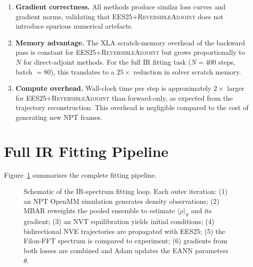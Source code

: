 \documentclass{article}
\newcommand{\EES}{\textsc{EES25}}
\newcommand{\RevAdj}{\textsc{ReversibleAdjoint}}
\newcommand{\EANN}{\textsc{EANN}}
\newcommand{\MBAR}{\textsc{MBAR}}
\begin{document}
\begin{enumerate}
  \item \textbf{Gradient correctness.}
    All methods produce similar loss curves and gradient norms, validating
    that \EES{}+\RevAdj{} does not introduce spurious numerical artefacts.

  \item \textbf{Memory advantage.}
    The XLA scratch-memory overhead of the backward pass is constant for
    \EES{}+\RevAdj{} but grows proportionally to $N$ for direct-adjoint
    methods.  For the full IR fitting task ($N = 400$ steps, batch $= 80$),
    this translates to a $25\times$ reduction in solver scratch memory.

  \item \textbf{Compute overhead.}
    Wall-clock time per step is approximately $2\times$ larger for
    \EES{}+\RevAdj{} than forward-only, as expected from the trajectory
    reconstruction.  This overhead is negligible compared to the cost
    of generating new NPT frames.
\end{enumerate}

\section{Full IR Fitting Pipeline}
\label{sec:pipeline}

Figure~\ref{fig:pipeline} summarises the complete fitting pipeline.

\begin{figure}[h]
\centering
\begin{tikzpicture}
\end{tikzpicture}
\caption{%
  Schematic of the IR-spectrum fitting loop.
  Each outer iteration: (1) an NPT OpenMM simulation generates density
  observations; (2) \MBAR{} reweights the pooled ensemble to estimate
  $\langle\rho\rangle_\theta$ and its gradient; (3) an NVT equilibration
  yields initial conditions; (4) bidirectional NVE trajectories are
  propagated with \EES{}; (5) the Filon-FFT spectrum is compared to
  experiment; (6) gradients from both losses are combined and Adam updates
  the \EANN{} parameters $\theta$.
}
\label{fig:pipeline}
\end{figure}
\end{document}
